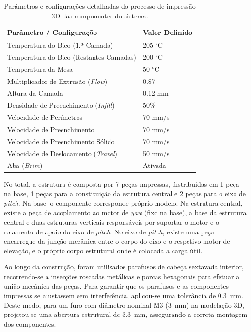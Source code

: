 \begin{longtable}{ll}
    \caption[Configurações Principais da Impressão 3D]{Parâmetros e configurações detalhadas do processo de impressão 3D das componentes do sistema.} \label{tab:config_impressao3d} \\
    \toprule
    \textbf{Parâmetro / Configuração} & \textbf{Valor Definido} \\
    \midrule
    \endhead 
    
    \bottomrule
    \endfoot 
    
    Temperatura do Bico (1.ª Camada) & 205 °C \\
    Temperatura do Bico (Restantes Camadas) & 200 °C \\
    Temperatura da Mesa & 50 °C \\
    Multiplicador de Extrusão (\emph{Flow}) & 0.87 \\
    Altura da Camada & 0.12 mm \\
    Densidade de Preenchimento (\emph{Infill}) & 50\% \\
    Velocidade de Perímetros & 70 mm/s \\
    Velocidade de Preenchimento & 70 mm/s \\
    Velocidade de Preenchimento Sólido & 70 mm/s \\
    Velocidade de Deslocamento (\emph{Travel}) & 50 mm/s \\
    Aba (\emph{Brim}) & Ativada \\
\end{longtable}

No total, a estrutura é composta por 7 peças impressas, distribuídas em 1 peça na base, 4 peças para a constituição da estrutura central e 2 peças para o eixo de \emph{pitch}. Na base, o componente corresponde próprio modelo. Na estrutura central, existe a peça de acoplamento ao motor de \emph{yaw} (fixo na base), a base da estrutura central e duas estruturas verticais responsáveis por suportar o motor e o rolamento de apoio do eixo de \emph{pitch}. No eixo de \emph{pitch}, existe uma peça encarregue da junção mecânica entre o corpo do eixo e o respetivo motor de elevação, e o próprio corpo estrutural onde é colocada a carga útil.

Ao longo da construção, foram utilizados parafusos de cabeça sextavada interior, recorrendo-se a inserções roscadas metálicas e porcas hexagonais para efetuar a união mecânica das peças. Para garantir que os parafusos e as componentes impressas se ajustassem sem interferência, aplicou-se uma tolerância de 0.3~mm. Deste modo, para um furo com diâmetro nominal M3 (3~mm) na modelação 3D, projetou-se uma abertura estrutural de 3.3~mm, assegurando a correta montagem dos componentes.

